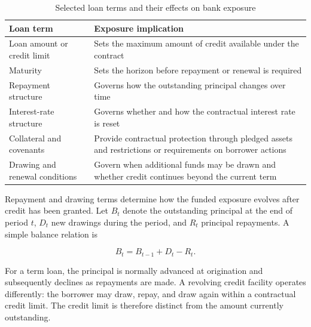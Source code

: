 \begin{table}[htbp]

\centering

\caption{Selected loan terms and their effects on bank exposure}

\label{tab:ch12-loan-terms-exposure}

\begin{tabularx}{0.90\textwidth}{@{}p{} X@{}}

\toprule

\textbf{Loan term} &
\textbf{Exposure implication} \\

\midrule

Loan amount or credit limit &
Sets the maximum amount of credit available under the contract \\

Maturity &
Sets the horizon before repayment or renewal is required \\

Repayment structure &
Governs how the outstanding principal changes over time \\

Interest-rate structure &
Governs whether and how the contractual interest rate is reset \\

Collateral and covenants &
Provide contractual protection through pledged assets and restrictions or requirements on borrower actions \\

Drawing and renewal conditions &
Govern when additional funds may be drawn and whether credit continues beyond the current term \\

\bottomrule

\end{tabularx}

\end{table}

Repayment and drawing terms determine how the funded exposure evolves after credit has been granted. Let $B_t$ denote the outstanding principal at the end of period $t$, $D_t$ new drawings during the period, and $R_t$ principal repayments. A simple balance relation is

\begin{equation}
B_t=B_{t-1}+D_t-R_t.
\label{eq:ch12-loan-balance-dynamics}
\end{equation}

For a term loan, the principal is normally advanced at origination and subsequently declines as repayments are made. A revolving credit facility operates differently: the borrower may draw, repay, and draw again within a contractual credit limit. The credit limit is therefore distinct from the amount currently outstanding.

